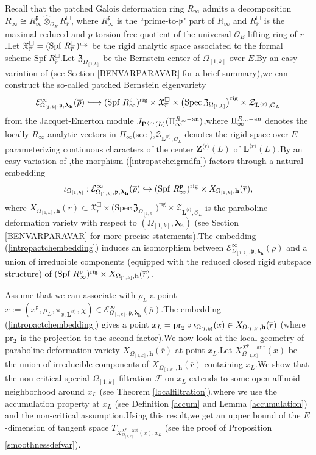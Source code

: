\documentclass[SecEq,CM,GP]{degruyter-crelle} %
\theoremstyle{plain}
\newcommand{\hooklongrightarrow}{\lhook\joinrel\longrightarrow}
\newcommand{\ana}{{\rm an}}
\newcommand{\bersteineigenvarpik}{{\mathcal{E}_{\omepik,\fp,\bm{\lambda}_\bh}^\infty(\overline{\rho})}}
\newcommand{\defvar}{{ X_{\omepik,\mathbf{{h}}}(\overline{r})}}
\newcommand{\defvarrho}{{ X_{\omepik,\mathbf{{h}}}(\overline{r})}}
\newcommand{\lrr}{{\langle r\rangle}}
\newcommand{\omepik}{\Omega_{[1,k]}}
\newcommand{\pr}{{\rm pr}}
\newcommand{\rig}{{\rm rig}}
\newcommand{\rigch}{{\mathcal{Z}_{\bL^{\lrr},\mathcal{O}_L}}}
\newcommand{\Spf}{{\mathrm{Spf}}}
\newcommand{\sbanpik}{{\big(\mathrm{Spec}\hspace{2pt}\mathfrak{Z}_{\omepik}\big)^{\mathrm{rig}}}}
\newcommand{\xfpx}{X^{X^\fp-\mathrm{aut}}_{\omepik}(x)}
\newcommand{\bL}{{\mathbf{L}}}
\newcommand{\bP}{{\mathbf{P}}}
\newcommand{\bZ}{{\mathbf{Z}}}
\newcommand{\bh}{{\mathbf{h}}}
\newcommand{\cF}{\mathcal F}
\newcommand{\cO}{\mathcal O}
\newcommand{\fp}{{\mathfrak{p}}}
\begin{document}
Recall that the  patched Galois deformation ring $R_\infty$ admits a decomposition $R_\infty\cong R^{\fp}_{\infty}\widehat{\otimes}_{\cO_E}R^{\Box}_{\overline{r}}$, where $R^{\fp}_{\infty}$ is the ``prime-to-$\fp$" part of $R_\infty$ and $R^{\Box}_{\overline{r}}$ is the maximal reduced and $p$-torsion free quotient of the universal $\cO_E$-lifting ring of $\overline{r}$.\;Let $\mathfrak{X}_{\overline{r}}^\Box=(\Spf\;R^{\Box}_{\overline{r}})^{\rig}$ be the 
rigid analytic space associated to the formal scheme $\Spf\;R^{\Box}_{\overline{r}}$.\;Let $\mathfrak{Z}_{\omepik}$ be the Bernstein center of $\omepik$ over $E$.\;By an easy variation of  \cite[Section 3.3]{Ding2021} (see Section \ref{BENVARPARAVAR} for a brief summary),\;we can construct the so-called patched Bernstein eigenvariety 
\begin{equation}\label{intropatcheigrndfn}
	\bersteineigenvarpik \hooklongrightarrow (\Spf\;R^{\fp}_{\infty})^{\rig}\times \mathfrak{X}_{\overline{r}}^\Box \times \sbanpik\times \rigch
\end{equation}
from the Jacquet-Emerton module $J_{\bP^{\lrr}(L)}(\Pi_\infty^{R_\infty-\ana})$,\;where
$\Pi_\infty^{R_\infty-\ana}$ denotes the locally $R_\infty$-analytic vectors in $\Pi_\infty$(see \cite[Section 3.1]{breuil2017interpretation}),\;$\rigch$ denotes the rigid space over $E$ parameterizing continuous characters of the center $\bZ^{\lrr}(L)$ of $\bL^{\lrr}(L)$.\;By an easy variation of  \cite[Section 3.3,\;Section 4.4]{Ding2021},\;the morphism (\ref{intropatcheigrndfn}) factors through a natural embedding
\begin{equation}\label{intropactchembedding}
	\iota_{\omepik}:\bersteineigenvarpik\hookrightarrow (\Spf\; R^{\fp}_{\infty})^{\rig}\times \defvar,
\end{equation}
where $\defvar\subset \mathfrak{X}_{\overline{r}}^\Box \times \sbanpik\times \rigch$ is the paraboline deformation variety with respect to $(\omepik,{\bm\lambda}_\bh)$ (see Section \ref{BENVARPARAVAR} for more precise statements).\;The embedding (\ref{intropactchembedding}) induces an isomorphism between $\bersteineigenvarpik$ and a union of irreducible components (equipped with the reduced closed rigid subspace structure) of $(\Spf\; R^{\fp}_{\infty})^{\rig}\times \defvar$.\;

Assume that we can associate with $\rho_L$ a point $x:=(x^{\fp}, \rho_L, \pi_{x,\bL^{\lrr}},\chi)\in \bersteineigenvarpik$.\;The embedding (\ref{intropactchembedding}) gives a point $x_L=\pr_2\circ\iota_{\omepik}(x)\in \defvarrho$ (where $\pr_2$ is the projection to the second factor).\;We now look at the local geometry of paraboline deformation variety $\defvarrho$ at point $x_L$.\;Let $\xfpx$ be the union of  irreducible components of $\defvarrho$ containing $x_L$.\;We show that the non-critical special
$\omepik$-filtration $\cF$ on $x_L$  extends to some open affinoid neighborhood around $x_L$ (see Theorem \ref{localfiltration}),\;where we use the accumulation property
at $x_L$ (see Definition \ref{accum} and Lemma \ref{accumulation}) and the non-critical assumption.\;Using this result,\;we get an upper bound of the $E$-dimension of tangent space $T_{\xfpx,x_L}$ (see the proof of Proposition \ref{smoothnessdefvar}).\;
\end{document}
